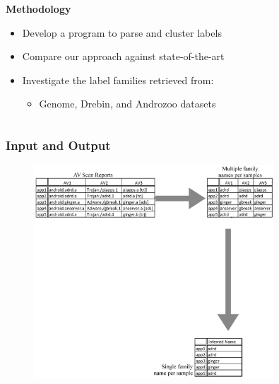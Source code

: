 \begin{frame}
\begin{columns}
\begin{column}{0.81\textwidth}
            \begin{block}{}
                \centering
                \textbf{Methodology}
            \end{block}
            \begin{itemize}
                \item Develop a program to parse and cluster labels
                \item Compare our approach against state-of-the-art
                \item Investigate the label families retrieved from:
                \begin{itemize}
                    \item Genome, Drebin, and Androzoo datasets
                \end{itemize}
            \end{itemize}
        \end{column}
    \end{columns}

\end{frame}

\begin{frame}
    \frametitle{Input and Output}

    \begin{figure}
        \vspace{-5pt}
        \includegraphics[width=0.8\textwidth]{figures/euphony/architecture-zero.jpg}
    \end{figure}

\end{frame}

